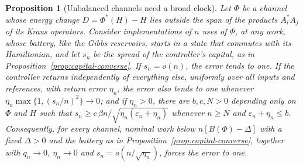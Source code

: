 \documentclass[11pt]{article}
\newtheorem{proposition}[theorem]{Proposition}
\theoremstyle{definition}
\theoremstyle{remark}
\begin{document}
\begin{proposition}[Unbalanced channels need a broad clock]\label{prop:broadclock}
Let $\Phi$ be a channel whose energy change $D=\Phi^*(H)-H$ lies outside the span of the products $A_i^*A_j$ of its Kraus operators. Consider implementations of $n$ uses of $\Phi$, at any work, whose battery, like the Gibbs reservoirs, starts in a state that commutes with its Hamiltonian, and let $s_n$ be the spread of the controller's capital, as in Proposition~\ref{prop:capital-converse}. If $s_n=o(n)$, the error tends to one. If the controller returns independently of everything else, uniformly over all inputs and references, with return error $\eta_n$, the error also tends to one whenever $\eta_n\max\{1,(s_n/n)^2\}\to0$; and if $\eta_n>0$, there are $b,c,N>0$ depending only on $\Phi$ and $H$ such that $s_n\ge c\,\beta n/\sqrt{\eta_n(\varepsilon_n+\eta_n)}$ whenever $n\ge N$ and $\varepsilon_n+\eta_n\le b$. Consequently, for every channel, nominal work below $n[B(\Phi)-\Delta]$ with a fixed $\Delta>0$ and the battery as in Proposition~\ref{prop:capital-converse}, together with $q_n\to0$, $\eta_n\to0$ and $s_n=o(n/\sqrt{\eta_n})$, forces the error to one.
\end{proposition}
\end{document}

